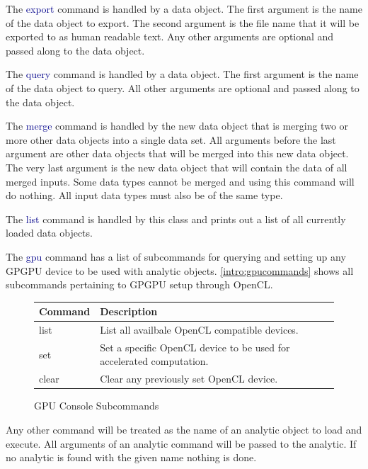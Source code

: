 \documentclass[10pt]{article}
\providecommand{\h}[1]{\textcolor{darkblue}{#1}}
\begin{document}
The \h{export} command is handled by a data object. The first argument is the 
name of the data object to export. The second argument is the file name that it 
will be exported to as human readable text. Any other arguments are optional 
and passed along to the data object.

The \h{query} command is handled by a data object. The first argument is the 
name of the data object to query. All other arguments are optional and passed 
along to the data object.

The \h{merge} command is handled by the new data object that is merging two or 
more other data objects into a single data set. All arguments before the last 
argument are other data objects that will be merged into this new data object. 
The very last argument is the new data object that will contain the data of all 
merged inputs. Some data types cannot be merged and using this command will do 
nothing. All input data types must also be of the same type.

The \h{list} command is handled by this class and prints out a list of all 
currently loaded data objects.

The \h{gpu} command has a list of subcommands for querying and setting up any 
GPGPU device to be used with analytic objects. \autoref{intro:gpucommands} shows 
all subcommands pertaining to GPGPU setup through OpenCL.

\begin{figure}[H]
\begin{mdframed}[style=vtable]
\begin{tabularx}{\textwidth}{|l|X|}
\hline
\textbf{Command} & \textbf{Description} \\
\hline
list & List all availbale OpenCL compatible devices. \\
\hline
set & Set a specific OpenCL device to be used for accelerated computation. \\
\hline
clear & Clear any previously set OpenCL device. \\
\hline
\end{tabularx}
\end{mdframed}
\caption{GPU Console Subcommands}
\label{intro:gpucommands}
\end{figure}

Any other command will be treated as the name of an analytic object to load and 
execute. All arguments of an analytic command will be passed to the analytic. 
If no analytic is found with the given name nothing is done.
\end{document}
